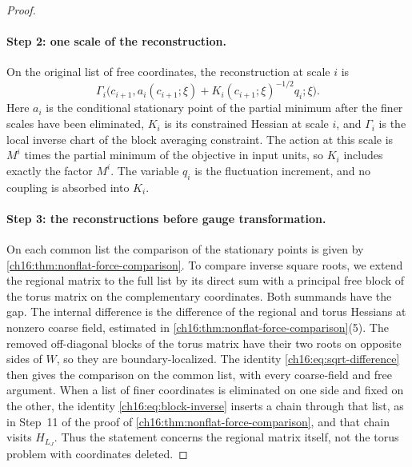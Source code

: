 \begin{proof}
\paragraph{Step 2: one scale of the reconstruction.}
On the original list of free coordinates, the reconstruction at scale $i$ is
\begin{equation}\label{ch16:eq:raw-shell-step}
 \Gamma_i\bigl(c_{i+1},
      a_i(c_{i+1};\xi)+K_i(c_{i+1};\xi)^{-1/2}q_i;\xi\bigr).
\end{equation}
Here $a_i$ is the conditional stationary point of the partial minimum after the finer scales have been eliminated, $K_i$ is its constrained Hessian at scale $i$, and $\Gamma_i$ is the local inverse chart of the block averaging constraint. The action at this scale is $M^i$ times the partial minimum of the objective in input units, so $K_i$ includes exactly the factor $M^i$. The variable $q_i$ is the fluctuation increment, and no coupling is absorbed into $K_i$.

\paragraph{Step 3: the reconstructions before gauge transformation.}
On each common list the comparison of the stationary points is given by \cref{ch16:thm:nonflat-force-comparison}. To compare inverse square roots, we extend the regional matrix to the full list by its direct sum with a principal free block of the torus matrix on the complementary coordinates. Both summands have the gap. The internal difference is the difference of the regional and torus Hessians at nonzero coarse field, estimated in \cref{ch16:thm:nonflat-force-comparison}(5). The removed off-diagonal blocks of the torus matrix have their two roots on opposite sides of $W$, so they are boundary-localized. The identity \eqref{ch16:eq:sqrt-difference} then gives the comparison on the common list, with every coarse-field and free argument. When a list of finer coordinates is eliminated on one side and fixed on the other, the identity \eqref{ch16:eq:block-inverse} inserts a chain through that list, as in Step~11 of the proof of \cref{ch16:thm:nonflat-force-comparison}, and that chain visits $H_{L_J}$. Thus the statement concerns the regional matrix itself, not the torus problem with coordinates deleted.


\end{proof}
